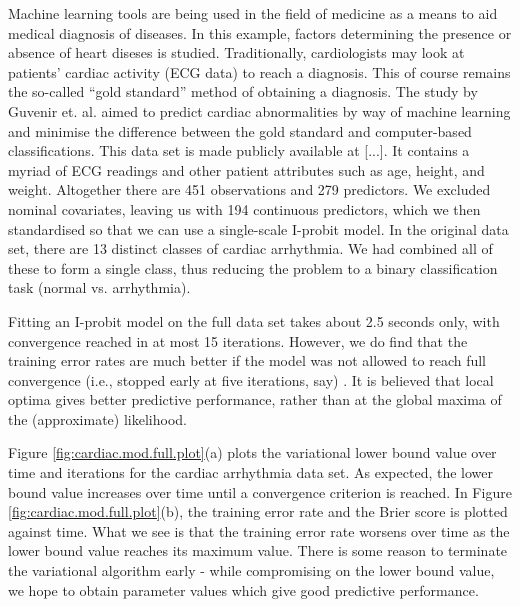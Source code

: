 \documentclass[a4paper,showframe,11pt]{report}\usepackage[]{graphicx}\usepackage[]{color}
\begin{document}
Machine learning tools are being used in the field of medicine as a means to aid medical diagnosis of diseases. In this example, factors determining the presence or absence of heart diseses is studied. Traditionally, cardiologists may look at patients' cardiac activity (ECG data) to reach a diagnosis. This of course remains the so-called ``gold standard'' method of obtaining a diagnosis. The study by Guvenir et. al. aimed to predict cardiac abnormalities by way of machine learning and minimise the difference between the gold standard and computer-based classifications. This data set is made publicly available at [...]. It contains a myriad of ECG readings and other patient attributes such as age, height, and weight. Altogether there are 451 observations and 279 predictors. We excluded nominal covariates, leaving us with 194 continuous predictors, which we then standardised so that we can use a single-scale I-probit model. In the original data set, there are 13 distinct classes of cardiac arrhythmia. We had combined all of these to form a single class, thus reducing the problem to a binary classification task (normal vs. arrhythmia).

Fitting an I-probit model on the full data set takes about 2.5 seconds only, with convergence reached in at most 15 iterations.
However, we do find that the training error rates are much better if the model was not allowed to reach full convergence (i.e., stopped early at five iterations, say)
.
It is believed that local optima gives better predictive performance, rather than at the global maxima of the (approximate) likelihood.

Figure \ref{fig:cardiac.mod.full.plot}(a) plots the variational lower bound value over time and iterations for the cardiac arrhythmia data set. As expected, the lower bound value increases over time until a convergence criterion is reached. In Figure \ref{fig:cardiac.mod.full.plot}(b), the training error rate and the Brier score is plotted against time. What we see is that the training error rate worsens over time as the lower bound value reaches its maximum value. There is some reason to terminate the variational algorithm early - while compromising on the lower bound value, we hope to obtain parameter values which give good predictive performance.
\end{document}
